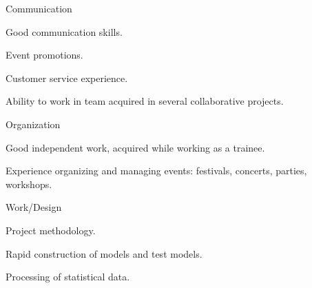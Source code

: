 


\begin{cventries}

  \vspace{0.5cm}
  \cventry
    {Communication} %
    {} 
    {} 
    {} 
    {
      \vspace{0.4cm}
      \begin{cvitems} %
        \item {Good communication skills.}
        \item {Event promotions.}
        \item {Customer service experience.} 
        \item {Ability to work in team acquired in several collaborative projects.}         
      \end{cvitems}
    }  
    
  \cventry
    {Organization} %
    {} 
    {} 
    {} 
    {
      \vspace{0.4cm} 
      \begin{cvitems} %
        \item {Good independent work, acquired while working as a trainee.} 
        \item {Experience organizing and managing events: festivals, concerts, parties, workshops.}
      \end{cvitems}
    }        
    

  \cventry
    {Work/Design} %
    {} 
    {} 
    {} 
    {
      \vspace{0.4cm}
      \begin{cvitems} %
        \item {Project methodology.}
        \item {Rapid construction of models and test models.}
        \item {Processing of statistical data.} 
      \end{cvitems}
    }  
  \vspace{-0.2cm} 



\end{cventries}
